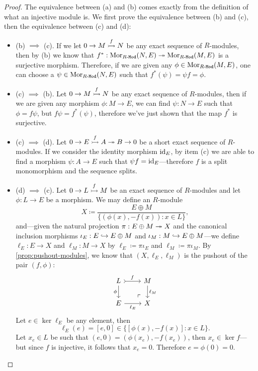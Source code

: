 \begin{proof}
The equivalence between (a) and (b) comes exactly from the definition of
what an injective module is. We first prove the equivalence between (b) and (c),
then the equivalence between (c) and (d):
\begin{itemize}\setlength\itemsep{0em}
\item (b) \(\implies\) (c). If we let \(0 \to M \overset{f}{\rightarrowtail} N\) be any
  exact sequence of \(R\)-modules, then by (b) we know that
  \(f^{*}: \operatorname{Mor}_{{R\text{-}\texttt{Mod}}}(N, E) \twoheadrightarrow \operatorname{Mor}_{{R\text{-}\texttt{Mod}}}(M, E)\) is a surjective
  morphism. Therefore, if we are given any \(\phi \in \operatorname{Mor}_{{R\text{-}\texttt{Mod}}}(M, E)\),
  one can choose a \(\psi \in \operatorname{Mor}_{{R\text{-}\texttt{Mod}}}(N, E)\) such that
  \(f^{*}(\psi) = \psi f = \phi\).

\item (c) \(\implies\) (b). Let \(0 \to M \overset{f}{\rightarrowtail} N\) be any exact
  sequence of \(R\)-modules, then if we are given any morphism
  \(\phi: M \to E\), we can find \(\psi: N \to E\) such that \(\phi = f \psi\),
  but \(f \psi = f^{*}(\psi)\), therefore we've just shown that the map
  \(f^{*}\) is surjective.

\item (c) \(\implies\) (d). Let \(0 \to E \overset f {\rightarrowtail} A \twoheadrightarrow B \to 0\) be
  a short exact sequence of \(R\)-modules. If we consider the identity morphism
  \(\operatorname{id}_E\), by item (c) we are able to find a morphism \(\psi: A \to E\) such
  that \(\psi f = \operatorname{id}_E\)---therefore \(f\) is a split monomorphism and the
  sequence splits.

\item (d) \(\implies\) (c). Let \(0 \to L \overset f {\rightarrowtail} M\) be an exact
  sequence of \(R\)-modules and let \(\phi: L \to E\) be a morphism. We may
  define an \(R\)-module
  \[
  X \coloneq \frac{E \oplus M}{\{(\phi(x), -f(x)) \colon x \in L\}},
  \]
  and---given the natural projection \(\pi: E \oplus M \twoheadrightarrow X\) and the
  canonical inclusion morphisms \(\iota_E: E \hookrightarrow E \oplus M\) and
  \(\iota_M: M \hookrightarrow E \oplus M\)---we define \(\ell_E: E \to X\) and
  \(\ell_M: M \to X\) by \(\ell_E \coloneq \pi \iota_E\) and
  \(\ell_M \coloneq \pi \iota_M\). By \cref{prop:pushout-modules}, we know that
  \((X, \ell_E, \ell_M)\) is the pushout of the pair \((f, \phi)\):
  \[
  \begin{tikzcd}
  L \ar[r, tail, "f"] \ar[d, swap, "\phi"]
  \ar[rd, phantom, very near end, "\ulcorner"]
  &M \ar[d, "\ell_M"] \\
  E \ar[r, "\ell_{E}"'] &X
  \end{tikzcd}
  \]
  Let \(e \in \ker \ell_{E}\) be any element, then
  \[
  \ell_E(e) = [e, 0] \in \{[\phi(x), -f(x)] \colon x \in L\}.
  \]
  Let \(x_e \in L\) be such that \((e, 0) = (\phi(x_e), -f(x_e))\), then
  \(x_e \in \ker f\)---but since \(f\) is injective, it follows that
  \(x_e = 0\). Therefore \(e = \phi(0) = 0\).


\end{itemize}
\end{proof}
